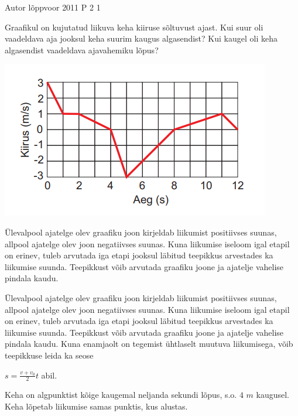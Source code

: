 {Autor} %
{lõppvoor} %
{2011} %
{P 2} %
{1} %
{

\ifStatement
Graafikul on kujutatud liikuva keha kiiruse sõltuvust ajast. Kui suur oli vaadeldava aja jooksul keha suurim kaugus algasendist? Kui kaugel oli keha algasendist vaadeldava ajavahemiku lõpus?
\begin{center}
	\includegraphics[width=0.5\linewidth]{2011-v3p-02-yl.PNG}
\end{center}
\fi

\ifHint
Ülevalpool ajatelge olev graafiku joon kirjeldab liikumist positiivses suunas, allpool ajatelge olev joon negatiivses suunas. Kuna liikumise iseloom igal etapil on erinev, tuleb arvutada iga etapi jooksul läbitud teepikkus arvestades ka liikumise suunda. Teepikkust võib arvutada graafiku joone ja ajatelje vahelise pindala kaudu.
\fi

\ifSolution
Ülevalpool ajatelge olev graafiku joon kirjeldab liikumist positiivses suunas, allpool ajatelge olev joon negatiivses suunas. Kuna liikumise iseloom igal etapil on erinev, tuleb arvutada iga etapi jooksul läbitud teepikkus arvestades ka liikumise suunda. Teepikkust võib arvutada graafiku joone ja ajatelje vahelise pindala kaudu. Kuna enamjaolt on tegemist ühtlaselt muutuva liikumisega, võib teepikkuse leida ka seose
\begin{center}
$s = \frac{v+v_0}{2} t$ abil. 
\end{center}
Keha on algpunktist kõige kaugemal neljanda sekundi lõpus, s.o. $4$ $m$ kaugusel. Keha lõpetab liikumise samas punktis, kus alustas.
\fi
}

